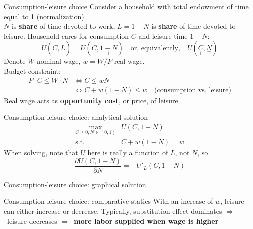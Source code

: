 \documentclass{beamer}
\newcommand{\rarr}{$\Rightarrow$\ }
\begin{document}
\begin{frame}{Consumption-leisure choice}
  Consider a household with total endowment of time equal to 1 (normalization) \\ $N$ is \textbf{share} of time devoted to work, $L=1-N$ is \textbf{share} of time devoted to leisure. \vfill 
  Household cares for consumption $C$ and leisure time $1-N$:
  \begin{equation*}
	U(\underset{+}{C}, \underset{+}{L}) =  U(\underset{+}{C}, \underset{+}{1-N}) \quad \text{or, equivalently,} \quad \tilde U(\underset{+}{C}, \underset{-}{N})
  \end{equation*} 
  Denote $W$ nominal wage, $w = W/P$ real wage. \\ Budget constraint:
  \begin{align*}
	P \cdot C \leq  W \cdot N &\Leftrightarrow C \leq w N \\
		&\Leftrightarrow C + w (1-N) \leq w \quad \text{(consumption vs. leisure)}
  \end{align*} 
  Real wage acts as \textbf{opportunity cost}, or price, of leisure
\end{frame}

\begin{frame}{Consumption-leisure choice: analytical solution}
\vspace{-3.5cm}
\begin{align*}
\max_{C\geq 0, N \in (0,1)} &U(C,1-N) \\ \text{s.t.} \quad &C + w (1-N) = w 
\end{align*}
When solving, note that $U$ here is really a function of $L$, not $N$, so $$\frac{\partial U(C, 1-N)}{\partial N} = - U'_L(C, 1-N)$$ 
\end{frame}

\begin{frame}{Consumption-leisure choice: graphical solution}
    
\end{frame}

\begin{frame}{Consumption-leisure choice: comparative statics}
\vspace{-4.5cm}
   With an increase of $w$, leisure can either increase or decrease. Typically, substitution effect dominates \rarr leisure decreases \rarr \textbf{more labor supplied when wage is higher} 
\end{frame}
\end{document}
